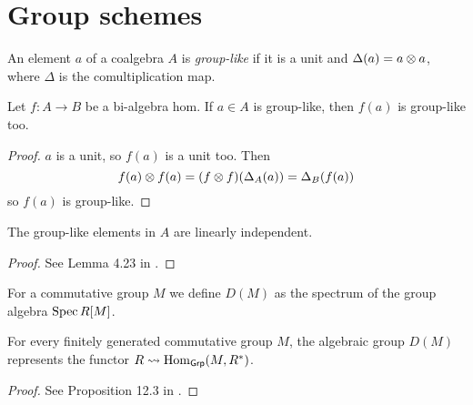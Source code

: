 \section{Group schemes}


\begin{definition}
  \label{0-grp-like}
  \uses{}
  \leanok

  An element $a$ of a coalgebra $A$ is \emph{group-like} if it is a unit and $\Delta(a) = a \otimes a$, where $\Delta$ is the comultiplication map.
\end{definition}


\begin{lemma}
  \label{0-grp-like-map}
  \leanok

  Let $f : A \to B$ be a bi-algebra hom. If $a \in A$ is group-like, then $f(a)$ is group-like too.
\end{lemma}
\begin{proof}
  \uses{}
  \leanok

  $a$ is a unit, so $f(a)$ is a unit too. Then
  \[
    f(a) \otimes f(a) = (f \otimes f)(\Delta_A(a)) = \Delta_B(f(a))
  \]
  so $f(a)$ is group-like.
\end{proof}


\begin{lemma}
  \label{0-grp-like-lin-indep}
  \leanok

  The group-like elements in $A$ are linearly independent.
\end{lemma}
\begin{proof}
  \leanok

  See Lemma 4.23 in \cite{Milne_2017}.
\end{proof}


\begin{definition}
  \label{grp_alg_sch}
  For a commutative group $M$ we define $D(M)$ as the spectrum of the group algebra $\operatorname{Spec} R[M]$.
\end{definition}


\begin{proposition}
  \label{DM_func}
  For every finitely generated commutative group $M$, the algebraic group $D(M)$
  represents the functor $R \rightsquigarrow \operatorname{Hom}_{\mathsf{Grp}}(M,R^*)$.
\end{proposition}
\begin{proof}
  See Proposition 12.3 in \cite{Milne_2017}.
\end{proof}


